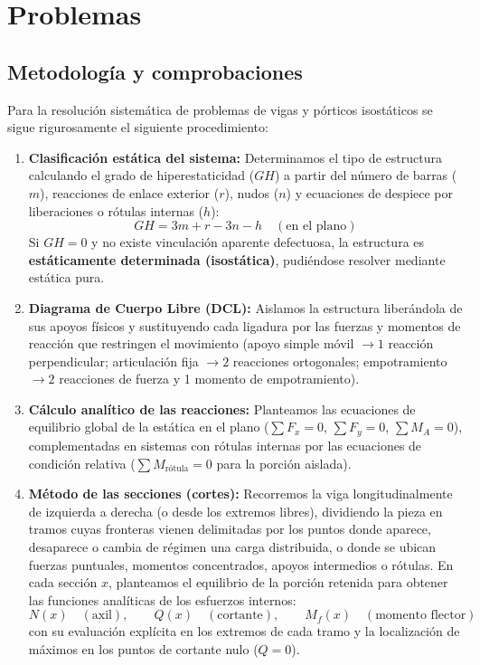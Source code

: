 \section{Problemas}

\subsection{Metodología y comprobaciones}

Para la resolución sistemática de problemas de vigas y pórticos isostáticos se sigue rigurosamente el siguiente procedimiento:

\begin{enumerate}
    \item \textbf{Clasificación estática del sistema:} Determinamos el tipo de estructura calculando el grado de hiperestaticidad ($GH$) a partir del número de barras ($m$), reacciones de enlace exterior ($r$), nudos ($n$) y ecuaciones de despiece por liberaciones o rótulas internas ($h$):
          \[
              GH = 3m + r - 3n - h \quad (\text{en el plano})
          \]
          Si $GH = 0$ y no existe vinculación aparente defectuosa, la estructura es \textbf{estáticamente determinada (isostática)}, pudiéndose resolver mediante estática pura.

    \item \textbf{Diagrama de Cuerpo Libre (DCL):} Aislamos la estructura liberándola de sus apoyos físicos y sustituyendo cada ligadura por las fuerzas y momentos de reacción que restringen el movimiento (apoyo simple móvil $\to 1$ reacción perpendicular; articulación fija $\to 2$ reacciones ortogonales; empotramiento $\to 2$ reacciones de fuerza y 1 momento de empotramiento).

    \item \textbf{Cálculo analítico de las reacciones:} Planteamos las ecuaciones de equilibrio global de la estática en el plano ($\sum F_x = 0$, $\sum F_y = 0$, $\sum M_A = 0$), complementadas en sistemas con rótulas internas por las ecuaciones de condición relativa ($\sum M_{\text{rótula}} = 0$ para la porción aislada).

    \item \textbf{Método de las secciones (cortes):} Recorremos la viga longitudinalmente de izquierda a derecha (o desde los extremos libres), dividiendo la pieza en tramos cuyas fronteras vienen delimitadas por los puntos donde aparece, desaparece o cambia de régimen una carga distribuida, o donde se ubican fuerzas puntuales, momentos concentrados, apoyos intermedios o rótulas. En cada sección $x$, planteamos el equilibrio de la porción retenida para obtener las funciones analíticas de los esfuerzos internos:
          \[
              N(x) \quad (\text{axil}), \qquad Q(x) \quad (\text{cortante}), \qquad M_f(x) \quad (\text{momento flector})
          \]
          con su evaluación explícita en los extremos de cada tramo y la localización de máximos en los puntos de cortante nulo ($Q = 0$).


\end{enumerate}
